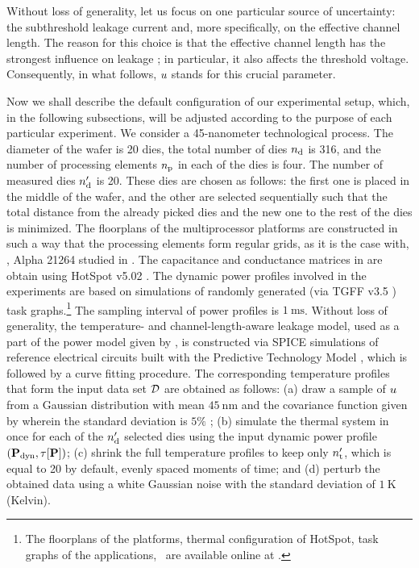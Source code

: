 Without loss of generality, let us focus on one particular source of uncertainty: the subthreshold leakage current and, more specifically, on the effective channel length.
The reason for this choice is that the effective channel length has the strongest influence on leakage \cite{chandrakasan2001, srivastava2010, juan2011, juan2012}; in particular, it also affects the threshold voltage. Consequently, in what follows, $u$ stands for this crucial parameter.

Now we shall describe the default configuration of our experimental setup, which, in the following subsections, will be adjusted according to the purpose of each particular experiment.
We consider a 45-nanometer technological process. The diameter of the wafer is 20 dies, the total number of dies ${n_\text{d}}$ is 316, and the number of processing elements ${n_\text{p}}$ in each of the dies is four.
The number of measured dies ${n_\text{d}'}$ is 20. These dies are chosen as follows: the first one is placed in the middle of the wafer, and the other are selected sequentially such that the total distance from the already picked dies and the new one to the rest of the dies is minimized.
The floorplans of the multiprocessor platforms are constructed in such a way that the processing elements form regular grids, as it is the case with, \eg, Alpha 21264 studied in \cite{juan2011}. The capacitance and conductance matrices in  are obtain using HotSpot v5.02 \cite{hotspot}.
The dynamic power profiles involved in the experiments are based on simulations of randomly generated (via TGFF v3.5 \cite{dick1998}) task graphs.\footnote{The floorplans of the platforms, thermal configuration of HotSpot, task graphs of the applications, \etc\ are available online at \cite{sources}.} The sampling interval of power profiles is $1~\text{ms}$.
Without loss of generality, the temperature- and channel-length-aware leakage model, used as a part of the power model given by , is constructed via SPICE simulations of reference electrical circuits built with the Predictive Technology Model \cite{ptm}, which is followed by a curve fitting procedure.
The corresponding temperature profiles that form the input data set $\mathcal{D}$ are obtained as follows: (a) draw a sample of $u$ from a Gaussian distribution with mean $45~\text{nm}$ and the covariance function given by  wherein the standard deviation is $5\%$ \cite{juan2011, juan2012}; (b) simulate the thermal system in  once for each of the ${n_\text{d}'}$ selected dies using the input dynamic power profile $(\mathbf{P}_{\text{dyn}}, \tau[\mathbf{P}])$; (c) shrink the full temperature profiles to keep only ${n_\text{t}'}$, which is equal to 20 by default, evenly spaced moments of time; and (d) perturb the obtained data using a white Gaussian noise with the standard deviation of $1~\text{K}$ (Kelvin).

